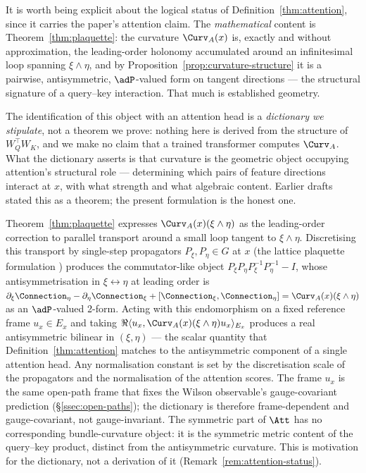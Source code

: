 \begin{remark}
\label{rem:attention-status}
It is worth being explicit about the logical status of
Definition~\ref{thm:attention}, since it carries the paper's
attention claim. The \emph{mathematical} content is
Theorem~\ref{thm:plaquette}: the curvature $\Curv_A(x)$ is, exactly
and without approximation, the leading-order holonomy accumulated
around an infinitesimal loop spanning $\xi\wedge\eta$, and by
Proposition~\ref{prop:curvature-structure} it is a pairwise,
antisymmetric, $\adP$-valued form on tangent directions --- the
structural signature of a query--key interaction. That much is
established geometry.

The identification of this object with an attention head is a
\emph{dictionary we stipulate}, not a theorem we prove: nothing here
is derived from the structure of $W_Q^\top W_K$, and we make no
claim that a trained transformer computes $\Curv_A$. What the
dictionary asserts is that curvature is the geometric object
occupying attention's structural role --- determining which pairs of
feature directions interact at $x$, with what strength and what
algebraic content. Earlier drafts stated this as a theorem; the
present formulation is the honest one.
\end{remark}

\begin{remark}
\label{rem:lattice-motivation}
Theorem~\ref{thm:plaquette} expresses
$\Curv_A(x)(\xi\wedge\eta)$ as the leading-order correction to
parallel transport around a small loop tangent to $\xi\wedge\eta$.
Discretising this transport by single-step propagators
$P_\xi,P_\eta\in G$ at $x$ (the lattice plaquette formulation
\cite{Wilson1974}) produces the commutator-like object
$P_\xi P_\eta P_\xi^{-1}P_\eta^{-1}-I$, whose antisymmetrisation in
$\xi\leftrightarrow\eta$ at leading order is
$\partial_\xi\Connection_\eta-\partial_\eta\Connection_\xi+
[\Connection_\xi,\Connection_\eta]=\Curv_A(x)(\xi\wedge\eta)$ as an
$\adP$-valued 2-form. Acting with this endomorphism on a fixed
reference frame $u_x\in E_x$ and taking
$\Re\langle u_x,\Curv_A(x)(\xi\wedge\eta)u_x\rangle_{E_x}$ produces
a real antisymmetric bilinear in $(\xi,\eta)$ --- the scalar
quantity that Definition~\ref{thm:attention} matches to the
antisymmetric component of a single attention head. Any
normalisation constant is set by the discretisation scale of the
propagators and the normalisation of the attention scores. The frame
$u_x$ is the same open-path frame that fixes the Wilson observable's
gauge-covariant prediction (\S\ref{ssec:open-paths}); the dictionary
is therefore frame-dependent and gauge-covariant, not
gauge-invariant. The symmetric part of $\Att$ has no corresponding
bundle-curvature object: it is the symmetric metric content of the
query--key product, distinct from the antisymmetric curvature. This
is motivation for the dictionary, not a derivation of it
(Remark~\ref{rem:attention-status}).
\end{remark}

